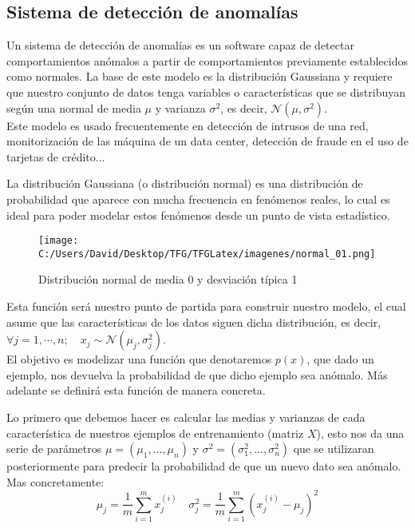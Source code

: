 \subsection{Sistema de detección de anomalías}
Un sistema de detección de anomalías es un software capaz de detectar comportamientos anómalos a 
partir de comportamientos previamente establecidos como normales.
La base de este modelo es la distribución Gaussiana y requiere que nuestro conjunto de 
datos tenga variables o características que se distribuyan según una normal de media $\mu$ y  
varianza $\sigma^2$, es decir, $\mathcal{N}(\mu, \sigma^2)$.\\
Este modelo es usado frecuentemente en detección de intrusos de una red, monitorización de las 
máquina de un data center, detección de fraude en el uso de tarjetas de crédito...
\newline

La distribución Gaussiana (o distribución normal) 
es una distribución de probabilidad que aparece con mucha frecuencia en fenómenos reales, lo cual es ideal 
para poder modelar estos fenómenos desde un punto de vista estadístico.

\begin{figure}[h]
  \centering
  \texttt{[image: C:/Users/David/Desktop/TFG/TFGLatex/imagenes/normal\_01.png]}
  \caption[$\mathcal{N}(0,1)$]{Distribución normal de media 0 y desviación típica 1}
  \label{normal_01}
\end{figure}

Esta función será nuestro punto de partida para construir nuestro modelo, el cual asume que las 
características de los datos siguen dicha distribución, es decir, 
$\forall j=1,\cdots,n; \quad x_j \sim \mathcal{N}(\mu_j, \sigma_j^2)$.\\

El objetivo es modelizar una función que denotaremos $p(x)$, que dado un ejemplo, nos devuelva la 
probabilidad de que dicho ejemplo sea anómalo. Más adelante se definirá esta función de manera 
concreta.

Lo primero que debemos hacer es calcular las medias y varianzas de cada característica de nuestros 
ejemplos de entrenamiento (matriz $X$), esto nos da una serie de parámetros 
$\mu = (\mu_1, \ldots, \mu_n) $ y 
$\sigma^2 = (\sigma_1^2, \ldots, \sigma_n^2) $ 
que se utilizaran posteriormente para predecir la probabilidad de que un nuevo dato sea anómalo. 
Mas concretamente:
$$ \mu_j = \frac{1}{m}\sum_{i=1}^{m}x_j^{(i)} \quad 
   \sigma_j^2 = \frac{1}{m}\sum_{i=1}^{m}(x_j^{(i)} - \mu_j)^2 $$

